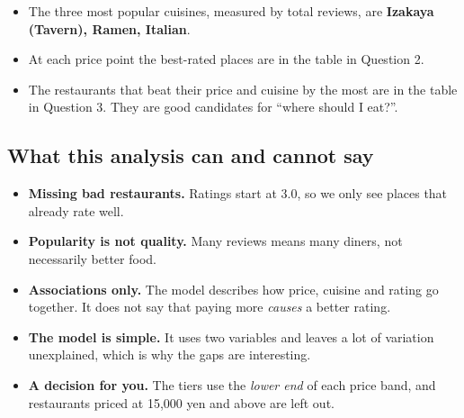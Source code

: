 \documentclass[
]{article}
\providecommand{\tightlist}{%
  \setlength{\itemsep}{0pt}\setlength{\parskip}{0pt}}
\begin{document}
\begin{itemize}
\tightlist
\item
  The three most popular cuisines, measured by total reviews, are
  \textbf{Izakaya (Tavern), Ramen, Italian}.
\item
  At each price point the best-rated places are in the table in Question
  2.
\item
  The restaurants that beat their price and cuisine by the most are in
  the table in Question 3. They are good candidates for ``where should I
  eat?''.
\end{itemize}

\subsection{What this analysis can and cannot
say}\label{what-this-analysis-can-and-cannot-say}

\begin{itemize}
\tightlist
\item
  \textbf{Missing bad restaurants.} Ratings start at 3.0, so we only see
  places that already rate well.
\item
  \textbf{Popularity is not quality.} Many reviews means many diners,
  not necessarily better food.
\item
  \textbf{Associations only.} The model describes how price, cuisine and
  rating go together. It does not say that paying more \emph{causes} a
  better rating.
\item
  \textbf{The model is simple.} It uses two variables and leaves a lot
  of variation unexplained, which is why the gaps are interesting.
\item
  \textbf{A decision for you.} The tiers use the \emph{lower end} of
  each price band, and restaurants priced at 15,000 yen and above are
  left out.
\end{itemize}
\end{document}
